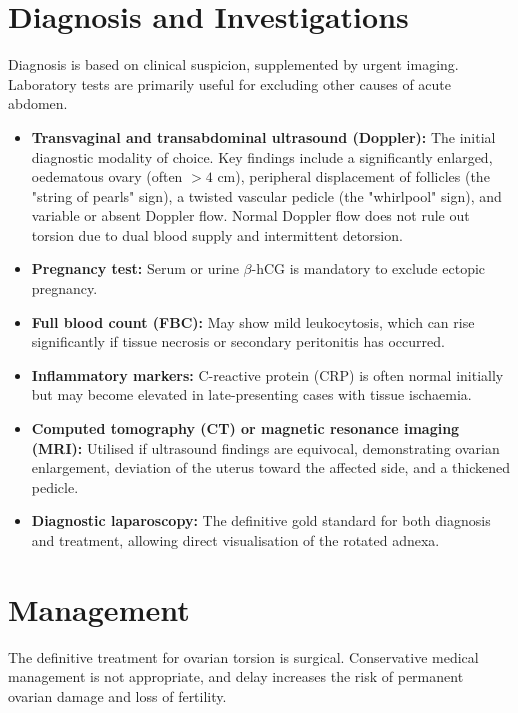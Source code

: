 \section*{Diagnosis and Investigations}
Diagnosis is based on clinical suspicion, supplemented by urgent imaging. Laboratory tests are primarily useful for excluding other causes of acute abdomen.

\begin{itemize}
    \item \textbf{Transvaginal and transabdominal ultrasound (Doppler):} The initial diagnostic modality of choice. Key findings include a significantly enlarged, oedematous ovary (often $>4$ cm), peripheral displacement of follicles (the "string of pearls" sign), a twisted vascular pedicle (the "whirlpool" sign), and variable or absent Doppler flow. Normal Doppler flow does not rule out torsion due to dual blood supply and intermittent detorsion.
    \item \textbf{Pregnancy test:} Serum or urine $\beta$-hCG is mandatory to exclude ectopic pregnancy.
    \item \textbf{Full blood count (FBC):} May show mild leukocytosis, which can rise significantly if tissue necrosis or secondary peritonitis has occurred.
    \item \textbf{Inflammatory markers:} C-reactive protein (CRP) is often normal initially but may become elevated in late-presenting cases with tissue ischaemia.
    \item \textbf{Computed tomography (CT) or magnetic resonance imaging (MRI):} Utilised if ultrasound findings are equivocal, demonstrating ovarian enlargement, deviation of the uterus toward the affected side, and a thickened pedicle.
    \item \textbf{Diagnostic laparoscopy:} The definitive gold standard for both diagnosis and treatment, allowing direct visualisation of the rotated adnexa.
\end{itemize}

\section*{Management}
The definitive treatment for ovarian torsion is surgical. Conservative medical management is not appropriate, and delay increases the risk of permanent ovarian damage and loss of fertility.

